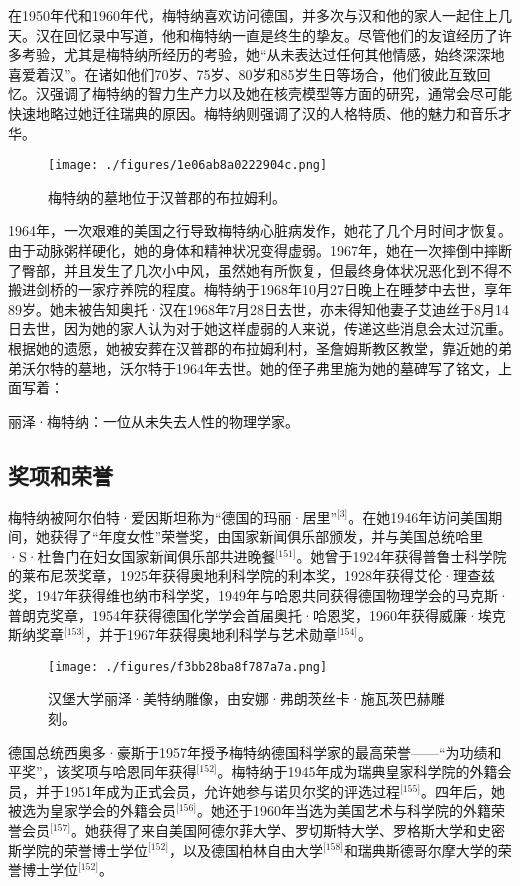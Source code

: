 在1950年代和1960年代，梅特纳喜欢访问德国，并多次与汉和他的家人一起住上几天。汉在回忆录中写道，他和梅特纳一直是终生的挚友。尽管他们的友谊经历了许多考验，尤其是梅特纳所经历的考验，她“从未表达过任何其他情感，始终深深地喜爱着汉”。在诸如他们70岁、75岁、80岁和85岁生日等场合，他们彼此互致回忆。汉强调了梅特纳的智力生产力以及她在核壳模型等方面的研究，通常会尽可能快速地略过她迁往瑞典的原因。梅特纳则强调了汉的人格特质、他的魅力和音乐才华。
\begin{figure}[ht]
\centering
\texttt{[image: ./figures/1e06ab8a0222904c.png]}
\caption{梅特纳的墓地位于汉普郡的布拉姆利。} \label{fig_LZm_15}
\end{figure}
1964年，一次艰难的美国之行导致梅特纳心脏病发作，她花了几个月时间才恢复。由于动脉粥样硬化，她的身体和精神状况变得虚弱。1967年，她在一次摔倒中摔断了臀部，并且发生了几次小中风，虽然她有所恢复，但最终身体状况恶化到不得不搬进剑桥的一家疗养院的程度。梅特纳于1968年10月27日晚上在睡梦中去世，享年89岁。她未被告知奥托·汉在1968年7月28日去世，亦未得知他妻子艾迪丝于8月14日去世，因为她的家人认为对于她这样虚弱的人来说，传递这些消息会太过沉重。根据她的遗愿，她被安葬在汉普郡的布拉姆利村，圣詹姆斯教区教堂，靠近她的弟弟沃尔特的墓地，沃尔特于1964年去世。她的侄子弗里施为她的墓碑写了铭文，上面写着：

丽泽·梅特纳：一位从未失去人性的物理学家。
\subsection{奖项和荣誉}
梅特纳被阿尔伯特·爱因斯坦称为“德国的玛丽·居里”\(^\text{[3]}\)。在她1946年访问美国期间，她获得了“年度女性”荣誉奖，由国家新闻俱乐部颁发，并与美国总统哈里·S·杜鲁门在妇女国家新闻俱乐部共进晚餐\(^\text{[151]}\)。她曾于1924年获得普鲁士科学院的莱布尼茨奖章，1925年获得奥地利科学院的利本奖，1928年获得艾伦·理查兹奖，1947年获得维也纳市科学奖，1949年与哈恩共同获得德国物理学会的马克斯·普朗克奖章，1954年获得德国化学学会首届奥托·哈恩奖，1960年获得威廉·埃克斯纳奖章\(^\text{[153]}\)，并于1967年获得奥地利科学与艺术勋章\(^\text{[154]}\)。
\begin{figure}[ht]
\centering
\texttt{[image: ./figures/f3bb28ba8f787a7a.png]}
\caption{汉堡大学丽泽·美特纳雕像，由安娜·弗朗茨丝卡·施瓦茨巴赫雕刻。} \label{fig_LZm_16}
\end{figure}
德国总统西奥多·豪斯于1957年授予梅特纳德国科学家的最高荣誉——“为功绩和平奖”，该奖项与哈恩同年获得\(^\text{[152]}\)。梅特纳于1945年成为瑞典皇家科学院的外籍会员，并于1951年成为正式会员，允许她参与诺贝尔奖的评选过程\(^\text{[155]}\)。四年后，她被选为皇家学会的外籍会员\(^\text{[156]}\)。她还于1960年当选为美国艺术与科学院的外籍荣誉会员\(^\text{[157]}\)。她获得了来自美国阿德尔菲大学、罗切斯特大学、罗格斯大学和史密斯学院的荣誉博士学位\(^\text{[152]}\)，以及德国柏林自由大学\(^\text{[158]}\)和瑞典斯德哥尔摩大学的荣誉博士学位\(^\text{[152]}\)。

